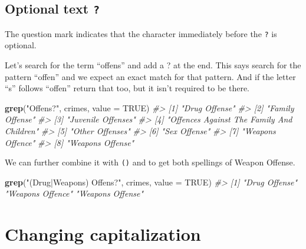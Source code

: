 \documentclass[
  12pt,
]{book}
\newenvironment{Shaded}{\begin{snugshade}}{\end{snugshade}}
\newcommand{\CommentTok}[1]{\textcolor[rgb]{0.37,0.37,0.37}{\textit{#1}}}
\newcommand{\DataTypeTok}[1]{\textcolor[rgb]{0.27,0.27,0.27}{#1}}
\newcommand{\KeywordTok}[1]{\textcolor[rgb]{0.27,0.27,0.27}{\textbf{#1}}}
\newcommand{\NormalTok}[1]{#1}
\newcommand{\OtherTok}[1]{\textcolor[rgb]{0.37,0.37,0.37}{#1}}
\newcommand{\StringTok}[1]{\textcolor[rgb]{0.5,0.5,0.5}{#1}}
\begin{document}
\hypertarget{optional-text}{%
\subsection{\texorpdfstring{Optional text \texttt{?}}{Optional text ?}}\label{optional-text}}

The question mark indicates that the character immediately before the \texttt{?} is optional.

Let's search for the term ``offens'' and add a ? at the end. This says search for the pattern ``offen'' and we expect an exact match for that pattern. And if the letter ``s'' follows ``offen'' return that too, but it isn't required to be there.

\begin{Shaded}
\begin{Highlighting}[]
\KeywordTok{grep}\NormalTok{(}\StringTok{"Offens?"}\NormalTok{, crimes, }\DataTypeTok{value =} \OtherTok{TRUE}\NormalTok{)}
\CommentTok{\#\textgreater{} [1] "Drug Offense"                            }
\CommentTok{\#\textgreater{} [2] "Family Offense"                          }
\CommentTok{\#\textgreater{} [3] "Juvenile Offenses"                       }
\CommentTok{\#\textgreater{} [4] "Offences Against The Family And Children"}
\CommentTok{\#\textgreater{} [5] "Other Offenses"                          }
\CommentTok{\#\textgreater{} [6] "Sex Offense"                             }
\CommentTok{\#\textgreater{} [7] "Weapons Offence"                         }
\CommentTok{\#\textgreater{} [8] "Weapons Offense"}
\end{Highlighting}
\end{Shaded}

We can further combine it with \texttt{()} and \texttt{\textbar{}} to get both spellings of Weapon Offense.

\begin{Shaded}
\begin{Highlighting}[]
\KeywordTok{grep}\NormalTok{(}\StringTok{"(Drug|Weapons) Offens?"}\NormalTok{, crimes, }\DataTypeTok{value =} \OtherTok{TRUE}\NormalTok{)}
\CommentTok{\#\textgreater{} [1] "Drug Offense"    "Weapons Offence" "Weapons Offense"}
\end{Highlighting}
\end{Shaded}

\hypertarget{changing-capitalization}{%
\section{Changing capitalization}\label{changing-capitalization}}
\end{document}
